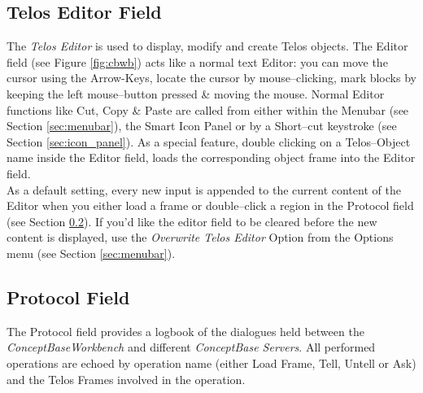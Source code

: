 \subsection{Telos Editor Field} 			\label{sec:editor}
The {\em Telos Editor} is used to display, modify and create Telos objects. The Editor field (see Figure \ref{fig:cbwb}) acts like a normal text Editor: you can move the cursor using the Arrow-Keys, locate the cursor by mouse--clicking, mark blocks by keeping the left mouse--button pressed \& moving the mouse. Normal Editor functions like Cut, Copy \& Paste are called from either within the Menubar (see Section \ref{sec:menubar}), the Smart Icon Panel or by a Short--cut keystroke (see Section \ref{sec:icon_panel}). As a special feature, double clicking on a Telos--Object name inside the Editor field, loads the corresponding object frame into the Editor field. \\
As a default setting, every new input is appended to the current content of the Editor when you either load a frame or double--click a region in the Protocol field (see Section \ref{sec:protocol}). If you'd like the editor field to be cleared before the new content is displayed, use the {\em Overwrite Telos Editor } Option from the Options menu (see Section \ref{sec:menubar}).



\subsection{Protocol Field}				\label{sec:protocol}
The Protocol field provides a logbook of the dialogues held between the {\em ConceptBase\/Workbench}  and different {\em ConceptBase Servers}. All  performed operations are echoed by operation name (either Load Frame, Tell, Untell or Ask) and the Telos Frames involved in the operation. \\

